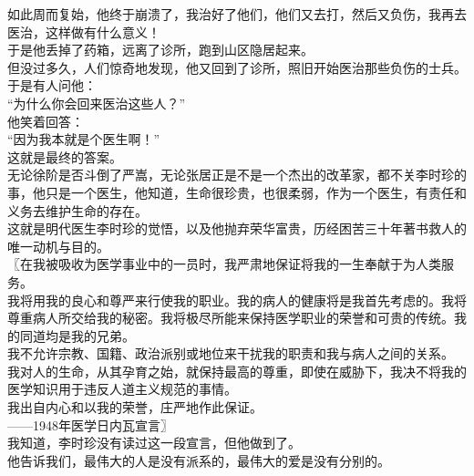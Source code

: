 \begin{multicols}{\theparacolNo}
如此周而复始，他终于崩溃了，我治好了他们，他们又去打，然后又负伤，我再去医治，这样做有什么意义！\\

于是他丢掉了药箱，远离了诊所，跑到山区隐居起来。\\

但没过多久，人们惊奇地发现，他又回到了诊所，照旧开始医治那些负伤的士兵。\\

于是有人问他：\\

“为什么你会回来医治这些人？”\\

他笑着回答：\\

“因为我本就是个医生啊！”\\

这就是最终的答案。\\

无论徐阶是否斗倒了严嵩，无论张居正是不是一个杰出的改革家，都不关李时珍的事，他只是一个医生，他知道，生命很珍贵，也很柔弱，作为一个医生，有责任和义务去维护生命的存在。\\

这就是明代医生李时珍的觉悟，以及他抛弃荣华富贵，历经困苦三十年著书救人的唯一动机与目的。\\

〖在我被吸收为医学事业中的一员时，我严肃地保证将我的一生奉献于为人类服务。\\

我将用我的良心和尊严来行使我的职业。我的病人的健康将是我首先考虑的。我将尊重病人所交给我的秘密。我将极尽所能来保持医学职业的荣誉和可贵的传统。我的同道均是我的兄弟。\\

我不允许宗教、国籍、政治派别或地位来干扰我的职责和我与病人之间的关系。\\

我对人的生命，从其孕育之始，就保持最高的尊重，即使在威胁下，我决不将我的医学知识用于违反人道主义规范的事情。\\

我出自内心和以我的荣誉，庄严地作此保证。\\

——1948年医学日内瓦宣言〗\\

我知道，李时珍没有读过这一段宣言，但他做到了。\\

他告诉我们，最伟大的人是没有派系的，最伟大的爱是没有分别的。\\


\end{multicols}
